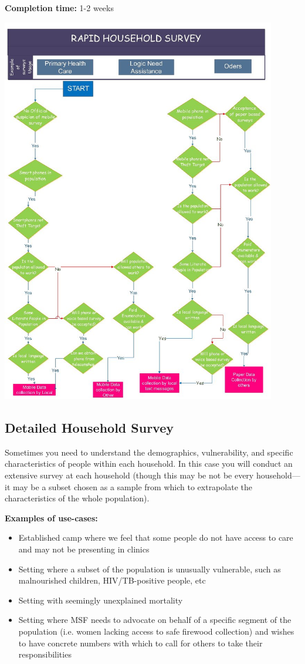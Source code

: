 \documentclass[a4paper,12pt,twoside]{article}
\begin{document}
\noindent
\textbf{Completion time:} 1-2 weeks

\includegraphics[width=0.9\textwidth]{images/Rapid_Household_Survey.jpeg}

\subsection{Detailed Household Survey}
Sometimes you need to understand the demographics, vulnerability, and specific characteristics of people within each household. In this case you will conduct an extensive survey at each household (though this may be not be every household---it may be a subset chosen as a sample from which to extrapolate the characteristics of the whole population). 



\noindent
\textbf{Examples of use-cases:}
\begin{itemize}
    \item Established camp where we feel that some people do not have access to care and may not be presenting in clinics
    \item Setting where a subset of the population is unusually vulnerable, such as malnourished children, HIV/TB-positive people, etc
    \item Setting with seemingly unexplained mortality
    \item Setting where MSF needs to advocate on behalf of a specific segment of the population (i.e. women lacking access to safe firewood collection) and wishes to have concrete numbers with which to call for others to take their responsibilities
\end{itemize}
\end{document}
